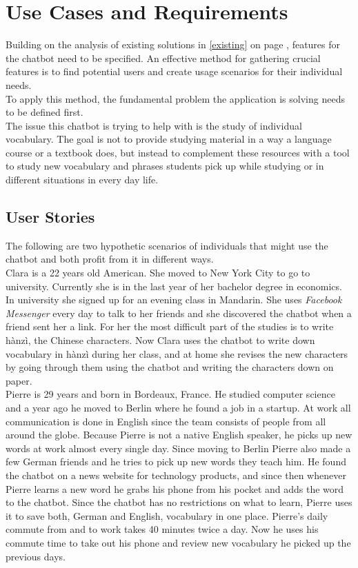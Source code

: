 \section{Use Cases and Requirements}


Building on the analysis of existing solutions in \ref{existing} on page \pageref{existing}, features for the chatbot need to be specified.
An effective method for gathering crucial features is to find potential users
and create usage scenarios for their individual needs.
\\

To apply this method, the fundamental problem the application is solving needs to be defined first.
\\
The issue this chatbot is trying to help with is the study of individual vocabulary.
The goal is not to provide studying material in a way a language course or a textbook does,
but instead to complement these resources with a tool to study new vocabulary and phrases students pick up
while studying or in different situations in every day life.
\\


\subsection{User Stories}

The following are two hypothetic scenarios of individuals that might use the chatbot and both profit from it in different ways.
\\

Clara is a 22 years old American.
She moved to New York City to go to university.
Currently she is in the last year of her bachelor degree in economics.
In university she signed up for an evening class in Mandarin.
She uses \emph{Facebook Messenger} every day to talk to her friends and she discovered the chatbot when a friend sent her a link.
For her the most difficult part of the studies is to write hànzì, the Chinese characters.
Now Clara uses the chatbot to write down vocabulary in hànzì during her class,
and at home she revises the new characters by going through them using the chatbot and writing the characters
down on paper.
\\

Pierre is 29 years and born in Bordeaux, France.
He studied computer science and a year ago he moved to Berlin where he found a job in a startup.
At work all communication is done in English since the team consists of people from all around the globe.
Because Pierre is not a native English speaker, he picks up new words at work almost every single day.
Since moving to Berlin Pierre also made a few German friends and he tries to pick up new words they teach him.
He found the chatbot on a news website for technology products,
and since then whenever Pierre learns a new word he grabs his phone from his pocket and adds the word to the chatbot.
Since the chatbot has no restrictions on what to learn, Pierre uses it to save both, German and English, vocabulary in one place.
Pierre's daily commute from and to work takes 40 minutes twice a day.
Now he uses his commute time to take out his phone and review new vocabulary he picked up the previous days.
\\


